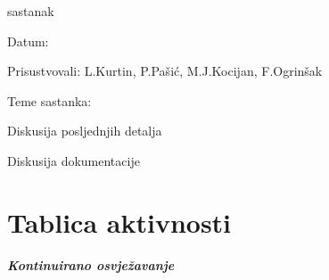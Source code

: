 \begin{packed_enum}
				\item  sastanak
			\item[] \begin{packed_item}
				\item Datum: \dvanaestisastanak
				\item Prisustvovali: L.Kurtin, P.Pašić, M.J.Kocijan, F.Ogrinšak
				\item Teme sastanka:
				\begin{packed_item}
					\item  Diskusija posljednjih detalja
					\item	Diskusija dokumentacije
				\end{packed_item}
			\end{packed_item}		
			
		\end{packed_enum}
		
		\eject
		\section*{Tablica aktivnosti}
		
			\textbf{\textit{Kontinuirano osvježavanje}}\\
			

